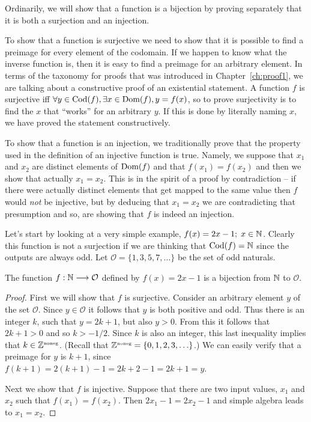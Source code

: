 Ordinarily, we will show that a function is a bijection by proving 
separately that it is both a surjection and an injection.  
   
To show that a function is surjective we need to show that it is 
possible to find a preimage for every element of the codomain.  If
we happen to know what the inverse function is, then it is easy to
find a preimage for an arbitrary element.  In terms of the taxonomy
for proofs that was introduced in Chapter~\ref{ch:proof1}, we are talking
about a constructive proof of an existential statement.  A function $f$
is surjective iff $\forall y \in \mbox{Cod}(f), \exists x \in \mbox{Dom}(f), 
y = f(x)$, so to prove surjectivity is to find the $x$ that ``works'' for an 
arbitrary $y$.  If this is done by literally naming $x$, we have 
proved the statement constructively.

To show that a function
is an injection, we traditionally prove that the property used in the 
definition of an injective function is true.  Namely, we suppose that
$x_1$ and $x_2$ are distinct elements of $\mbox{Dom}(f)$ and that
$f(x_1)=f(x_2)$ and then we show that actually $x_1 = x_2$.  This is
in the spirit of a proof by contradiction -- if there were actually
distinct elements that get mapped to the same value then $f$ would \emph{not}
be injective, but by deducing that $x_1=x_2$ we are contradicting that 
presumption and so, are showing that $f$ is indeed an injection.

Let's start by looking at a very simple example, 
$f(x)=2x-1; \; x \in {\mathbb N}$.  Clearly this function 
is not a surjection if we are thinking that $\mbox{Cod}(f)={\mathbb N}$
since the outputs are always odd.  Let ${\mathcal O} = \{1, 3, 5, 7, \ldots \}$
be the set of odd naturals.

\begin{thm}
The function $f:{\mathbb N} \longrightarrow {\mathcal O}$ defined by
$f(x) = 2x-1$ is a bijection from ${\mathbb N}$ to ${\mathcal O}$.
\end{thm}

\begin{proof}
First we will show that $f$ is surjective. Consider an arbitrary element
$y$ of the set $\mathcal O$.  Since $y \in {\mathcal O}$ it follows that
$y$ is both positive and odd.  Thus there is an integer $k$, such that 
$y=2k+1$, but also $y>0$.  From this it follows that  $2k+1 >0$ and so
$k > -1/2$.  Since $k$ is also an integer, this last inequality implies
that $k \in {\mathbb Z}^{\mbox{\tiny noneg}}$.  (Recall that ${\mathbb Z}^{\mbox{\tiny noneg}} = \{0,1,2,3, \ldots \}$.)  We can easily verify that a preimage 
for $y$ is $k+1$, since $f(k+1) = 2(k+1)-1 = 2k+2-1 = 2k+1 = y$.
   
Next we show that $f$ is injective.  Suppose that there are two input
values, $x_1$ and $x_2$ such that $f(x_1) = f(x_2)$.  Then $2x_1-1 = 2x_2-1$
and simple algebra leads to $x_1=x_2$.
\end{proof}
 

